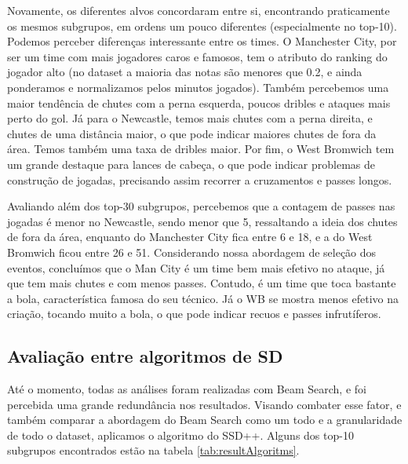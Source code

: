 \documentclass{article}
\begin{document}
Novamente, os diferentes alvos concordaram entre si, encontrando praticamente os mesmos subgrupos, em ordens 
um pouco diferentes (especialmente no top-10). Podemos perceber diferenças interessante entre os times. 
O Manchester City, por ser um time com mais jogadores caros e famosos, tem o atributo do ranking do jogador alto 
(no dataset a maioria das notas são menores que 0.2, e ainda ponderamos e normalizamos pelos minutos jogados). 
Também percebemos uma maior tendência de chutes com a perna esquerda, poucos dribles e ataques mais perto do gol. 
Já para o Newcastle, temos mais chutes com a perna direita, e chutes de uma distância maior, o que pode indicar 
maiores chutes de fora da área. Temos também uma taxa de dribles maior. Por fim, o West Bromwich tem um grande 
destaque para lances de cabeça, o que pode indicar problemas de construção de jogadas, precisando assim recorrer 
a cruzamentos e passes longos. 

Avaliando além dos top-30 subgrupos, percebemos que a contagem de passes nas jogadas é menor no Newcastle, 
sendo menor que 5, ressaltando a ideia dos chutes de fora da área, enquanto do Manchester City fica entre 6 e 18,
e a do West Bromwich ficou entre 26 e 51. Considerando nossa abordagem de seleção dos eventos, concluímos que 
o Man City é um time bem mais efetivo no ataque, já que tem mais chutes e com menos passes. Contudo, é um time que 
toca bastante a bola, característica famosa do seu técnico. Já o WB se mostra menos efetivo na criação, tocando 
muito a bola, o que pode indicar recuos e passes infrutíferos.

\subsection{Avaliação entre algoritmos de SD}

Até o momento, todas as análises foram realizadas com Beam Search, e foi percebida uma grande redundância 
nos resultados. Visando combater esse fator, e também comparar a abordagem do Beam Search como um todo e a 
granularidade de todo o dataset, aplicamos o algoritmo do SSD++. Alguns dos top-10 subgrupos encontrados 
estão na tabela \ref{tab:resultAlgoritms}.
\end{document}
